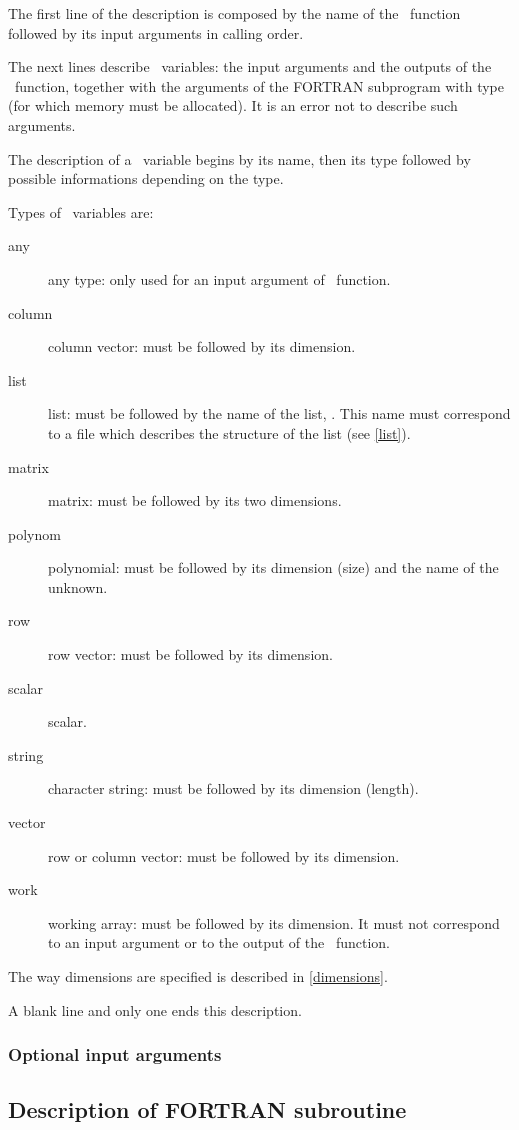 The first line of the description is composed by the name of the \SCI\
function followed by its input arguments in calling order.

The next lines describe \SCI\ variables: the input arguments and the
outputs of the \SCI\ function, together with the arguments of the FORTRAN
subprogram with type \T{work} (for which memory must be allocated).
It is an error not to describe such arguments.

The description of a \SCI\ variable begins by its name, then its type followed
by possible informations depending on the type.

Types of \SCI\ variables are:
\begin{description}
  \item[any] any type: only used for an input argument of \SCI\ function.
  \item[column] column vector: must be followed by its dimension.
  \item[list] list: must be followed by the name of the list,
. This name must correspond to a file 
which describes the structure of the list (see \ref{list}).
  \item[matrix] matrix: must be followed by its two dimensions.
  \item[polynom] polynomial: must be followed by its dimension (size) and the
name of the unknown.
  \item[row] row vector: must be followed by its dimension.
  \item[scalar] scalar.
  \item[string] character string: must be followed by its dimension
(length).
  \item[vector] row or column vector: must be followed by its dimension.
  \item[work] working array: must be followed by its dimension. It must not
correspond to an input argument or to the output of the \SCI\ function.
\end{description}

The way dimensions are specified is described in 
\ref{dimensions}.
\smallskip

A blank line and only one ends this description.

\subsubsection{Optional input arguments}

\subsection{Description of FORTRAN subroutine}
\label{fortran}

